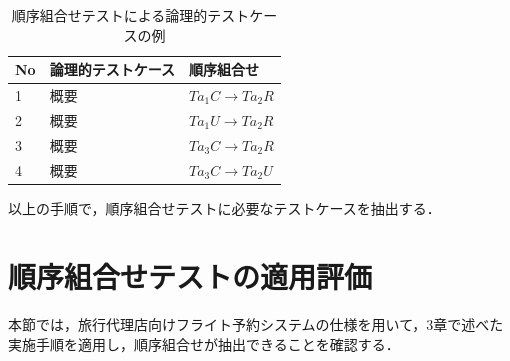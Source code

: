 \documentclass[a4paper,10pt]{jreport}
\begin{document}


\begin{table}[t]
  \centering
  \caption{順序組合せテストによる論理的テストケースの例}
    \begin{tabular}{l|l|l}
    No & 論理的テストケース & 順序組合せ \\
    \hline
    1 & 概要 & $Ta_1C \rightarrow Ta_2R$ \\
    \hline
    2 & 概要 & $Ta_1U \rightarrow Ta_2R$ \\
    \hline
    3 & 概要 & $Ta_3C \rightarrow Ta_2R$ \\
    \hline
    4 & 概要 & $Ta_3C \rightarrow Ta_2U$ \\
    \hline
    \end{tabular}%
\label{TCLISTSAMPLE}
\end{table}%


以上の手順で，順序組合せテストに必要なテストケースを抽出する．

\section{順序組合せテストの適用評価}
本節では，旅行代理店向けフライト予約システムの仕様を用いて，3章で述べた実施手順を適用し，順序組合せが抽出できることを確認する．
\end{document}
